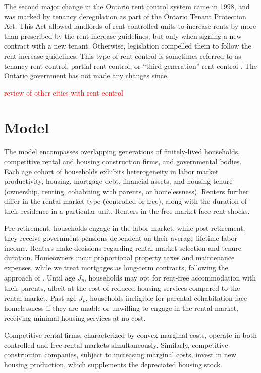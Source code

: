 \documentclass[parskip=full]{article}
\begin{document}
The second major change in the Ontario rent control system came in 1998, and was marked by tenancy deregulation as part of the Ontario Tenant Protection Act. This Act allowed landlords of rent-controlled units to increase rents by more than prescribed by the rent increase guidelines, but only when signing a new contract with a new tenant. Otherwise, legislation compelled them to follow the rent increase guidelines. This type of rent control is sometimes referred to as tenancy rent control, partial rent control, or “third-generation” rent control \citep{arnott-2003}. The Ontario government has not made any changes since. 

\textcolor{red}{review of other cities with rent control}

\section{Model}\label{sec:model}

The model encompasses overlapping generations of finitely-lived households, competitive rental and housing construction firms, and governmental bodies. Each age cohort of households exhibits heterogeneity in labor market productivity, housing, mortgage debt, financial assets, and housing tenure (ownership, renting, cohabiting with parents, or homelessness). Renters further differ in the rental market type (controlled or free), along with the duration of their residence in a particular unit. Renters in the free market face rent shocks.

Pre-retirement, households engage in the labor market, while post-retirement, they receive government pensions dependent on their average lifetime labor income. Renters make decisions regarding rental market selection and tenure duration. Homeowners incur proportional property taxes and maintenance expenses, while we treat mortgages as long-term contracts, following the approach of \citet{kkk-2021}. Until age $J_{p}$, households may opt for rent-free accommodation with their parents, albeit at the cost of reduced housing services compared to the rental market. Past age $J_{p}$, households ineligible for parental cohabitation face homelessness if they are unable or unwilling to engage in the rental market, receiving minimal housing services at no cost.

Competitive rental firms, characterized by convex marginal costs, operate in both controlled and free rental markets simultaneously. Similarly, competitive construction companies, subject to increasing marginal costs, invest in new housing production, which supplements the depreciated housing stock.
\end{document}
